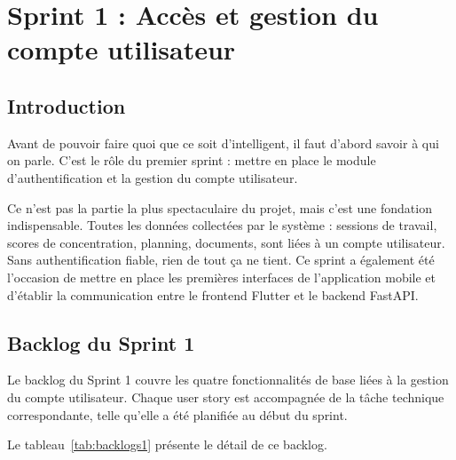 \chapter{Sprint 1 : Accès et gestion du compte utilisateur}
\label{chap:sprint1}

\section{Introduction}

Avant de pouvoir faire quoi que ce soit d’intelligent, il faut d’abord savoir à qui on parle. C’est le rôle du premier sprint : mettre en place le module d’authentification et la gestion du compte utilisateur.

Ce n’est pas la partie la plus spectaculaire du projet, mais c’est une fondation indispensable. Toutes les données collectées par le système : sessions de travail, scores de concentration, planning, documents, sont liées à un compte utilisateur. Sans authentification fiable, rien de tout ça ne tient. Ce sprint a également été l’occasion de mettre en place les premières interfaces de l’application mobile et d’établir la communication entre le frontend Flutter et le backend FastAPI.

\section{Backlog du Sprint 1}

Le backlog du Sprint 1 couvre les quatre fonctionnalités de base liées à la gestion du compte utilisateur. Chaque user story est accompagnée de la tâche technique correspondante, telle qu’elle a été planifiée au début du sprint.

Le tableau~\ref{tab:backlogs1} présente le détail de ce backlog.

